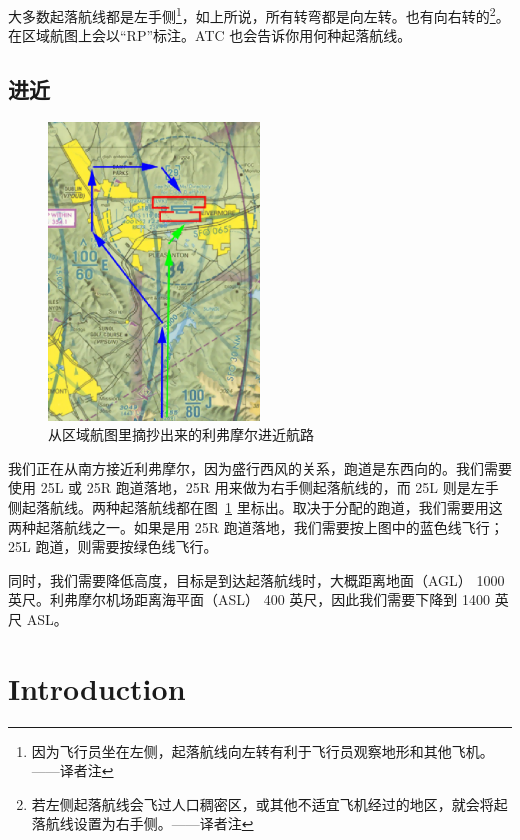 大多数起落航线都是左手侧\footnote{因为飞行员坐在左侧，起落航线向左转有利于飞行员观察地形和其他飞机。——译者注}，如上所说，所有转弯都是向左转。也有向右转的\footnote{若左侧起落航线会飞过人口稠密区，或其他不适宜飞机经过的地区，就会将起落航线设置为右手侧。——译者注}。在区域航图上会以“RP”标注。ATC 也会告诉你用何种起落航线。

\subsection{进近}

\begin{figure}[!htp]
\centering
\includegraphics[width=0.5\textwidth]{livermore_pattern3}
\caption{从区域航图里摘抄出来的利弗摩尔进近航路\label{approach}}
\end{figure}

我们正在从南方接近利弗摩尔，因为盛行西风的关系，跑道是东西向的。我们需要使用 25L 或 25R 跑道落地，25R 用来做为右手侧起落航线的，而 25L 则是左手侧起落航线。两种起落航线都在图~\ref{approach} 里标出。取决于分配的跑道，我们需要用这两种起落航线之一。如果是用 25R 跑道落地，我们需要按上图中的蓝色线飞行；25L 跑道，则需要按绿色线飞行。

同时，我们需要降低高度，目标是到达起落航线时，大概距离地面（AGL） 1000 英尺。利弗摩尔机场距离海平面（ASL） 400 英尺，因此我们需要下降到 1400 英尺 ASL。



\iffalse
\section{Introduction}

